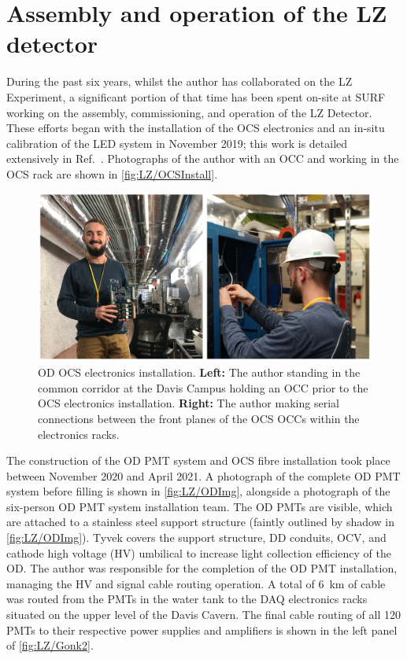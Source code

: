 \newpage

\section{Assembly and operation of the LZ detector}\label{sec:LZ/LZAssembly}
During the past six years, whilst the author has collaborated on the LZ Experiment, a significant portion of that time has been spent on-site at SURF working on the assembly, commissioning, and operation of the LZ Detector. These efforts began with the installation of the OCS electronics and an in-situ calibration of the LED system in November 2019; this work is detailed extensively in Ref.~\cite{hbirch:thesis}. Photographs of the author with an OCC and working in the OCS rack are shown in \autoref{fig:LZ/OCSInstall}.

\begin{figure}[h!]
    \centering
    \includegraphics[width=0.9\linewidth]{figures/LZ/OCSInstall_2panel.png}
    \caption[OD OCS electronics installation.]{OD OCS electronics installation. \textbf{Left:} The author standing in the common corridor at the Davis Campus holding an OCC prior to the OCS electronics installation. \textbf{Right:} The author making serial connections between the front planes of the OCS OCCs within the electronics racks.}
    \label{fig:LZ/OCSInstall}
\end{figure}

The construction of the OD PMT system and OCS fibre installation took place between November 2020 and April 2021. A photograph of the complete OD PMT system before filling is shown in \autoref{fig:LZ/ODImg}, alongside a photograph of the six-person OD PMT system installation team. The OD PMTs are visible, which are attached to a stainless steel support structure (faintly outlined by shadow in \autoref{fig:LZ/ODImg}). Tyvek covers the support structure, DD conduits, OCV, and cathode high voltage (HV) umbilical to increase light collection efficiency of the OD. The author was responsible for the completion of the OD PMT installation, managing the HV and signal cable routing operation. A total of 6~km of cable was routed from the PMTs in the water tank to the DAQ electronics racks situated on the upper level of the Davis Cavern. The final cable routing of all 120 PMTs to their respective power supplies and amplifiers is shown in the left panel of \autoref{fig:LZ/Gonk2}.


